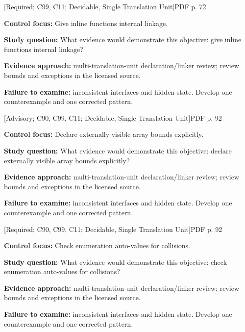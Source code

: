 \documentclass[10pt,letterpaper]{article}
\begin{document}
\smallskip
{}
 \textsf{\footnotesize [Required; C99, C11; Decidable, Single Translation Unit]}\hfill{\footnotesize PDF p. 72}\par
\textbf{Control focus:} Give inline functions internal linkage.\par
\textbf{Study question:} What evidence would demonstrate this objective: give inline functions internal linkage?\par
\textbf{Evidence approach:} multi-translation-unit declaration/linker review; review bounds and exceptions in the licensed source.\par
\textbf{Failure to examine:} inconsistent interfaces and hidden state. Develop one counterexample and one corrected pattern.\par
\smallskip
{}
 \textsf{\footnotesize [Advisory; C90, C99, C11; Decidable, Single Translation Unit]}\hfill{\footnotesize PDF p. 92}\par
\textbf{Control focus:} Declare externally visible array bounds explicitly.\par
\textbf{Study question:} What evidence would demonstrate this objective: declare externally visible array bounds explicitly?\par
\textbf{Evidence approach:} multi-translation-unit declaration/linker review; review bounds and exceptions in the licensed source.\par
\textbf{Failure to examine:} inconsistent interfaces and hidden state. Develop one counterexample and one corrected pattern.\par
\smallskip
{}
 \textsf{\footnotesize [Required; C90, C99, C11; Decidable, Single Translation Unit]}\hfill{\footnotesize PDF p. 92}\par
\textbf{Control focus:} Check enumeration auto-values for collisions.\par
\textbf{Study question:} What evidence would demonstrate this objective: check enumeration auto-values for collisions?\par
\textbf{Evidence approach:} multi-translation-unit declaration/linker review; review bounds and exceptions in the licensed source.\par
\textbf{Failure to examine:} inconsistent interfaces and hidden state. Develop one counterexample and one corrected pattern.\par
\smallskip
\end{document}
